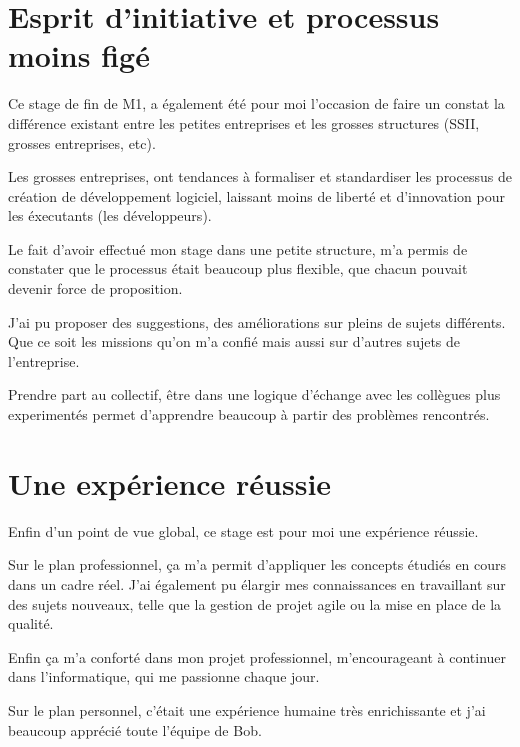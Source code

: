 \section{Esprit d'initiative et processus moins figé}

Ce stage de fin de M1, a également été pour moi l'occasion de faire un constat la différence existant entre les petites entreprises et les grosses structures (SSII, grosses entreprises, etc).

Les grosses entreprises, ont tendances à formaliser et standardiser les processus de création de développement logiciel, laissant moins de liberté et d'innovation pour les éxecutants (les développeurs). 

Le fait d'avoir effectué mon stage dans une petite structure, m'a permis de constater que le processus était beaucoup plus flexible, que chacun pouvait devenir force de proposition.

J'ai pu proposer des suggestions, des améliorations sur pleins de sujets différents.
Que ce soit les missions qu'on m'a confié mais aussi sur d'autres sujets de l'entreprise. 

Prendre part au collectif, être dans une logique d'échange avec les collègues plus experimentés permet d'apprendre beaucoup à partir des problèmes rencontrés. 


\section{Une expérience réussie}
Enfin d'un point de vue global, ce stage est pour moi une expérience réussie. 

Sur le plan professionnel, ça m'a permit d'appliquer les concepts étudiés en cours dans un cadre réel. 
J'ai également pu élargir mes connaissances en travaillant sur des sujets nouveaux, telle que la gestion de projet agile ou la mise en place de la qualité.

Enfin ça m'a conforté dans mon projet professionnel, m'encourageant à continuer dans l'informatique, qui me passionne chaque jour. 

Sur le plan personnel, c'était une expérience humaine très enrichissante et j'ai beaucoup apprécié toute l'équipe de Bob. 







